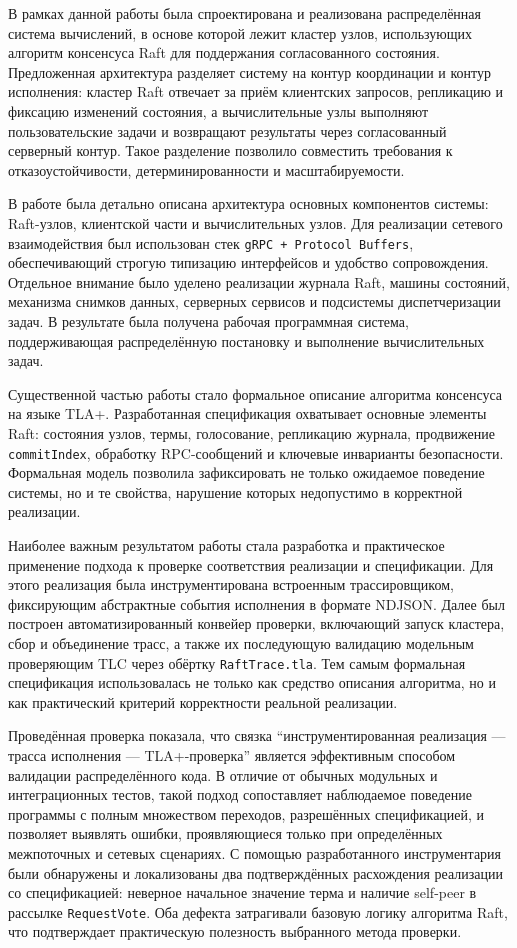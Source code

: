 \conclusion

В рамках данной работы была спроектирована и реализована распределённая система
вычислений, в основе которой лежит кластер узлов,
использующих алгоритм консенсуса Raft для поддержания согласованного состояния.
Предложенная архитектура разделяет систему на контур координации
и контур исполнения: кластер Raft отвечает за приём клиентских запросов,
репликацию и фиксацию изменений состояния, а вычислительные узлы выполняют
пользовательские задачи и возвращают результаты через согласованный
серверный контур. Такое разделение позволило совместить требования
к отказоустойчивости, детерминированности и масштабируемости.

В работе была детально описана архитектура основных компонентов системы:
Raft-узлов, клиентской части и вычислительных узлов. Для реализации сетевого
взаимодействия был использован стек \texttt{gRPC + Protocol Buffers},
обеспечивающий строгую типизацию интерфейсов и удобство сопровождения.
Отдельное внимание было уделено реализации журнала Raft, машины состояний,
механизма снимков данных, серверных сервисов и подсистемы диспетчеризации задач.
В результате была получена рабочая программная система, поддерживающая
распределённую постановку и выполнение вычислительных задач.

Существенной частью работы стало формальное описание алгоритма консенсуса
на языке TLA+. Разработанная спецификация охватывает основные элементы Raft:
состояния узлов, термы, голосование, репликацию журнала, продвижение
\texttt{commitIndex}, обработку RPC-сообщений и ключевые инварианты
безопасности. Формальная модель позволила зафиксировать не только ожидаемое
поведение системы, но и те свойства, нарушение которых недопустимо
в корректной реализации.

Наиболее важным результатом работы стала разработка и практическое применение
подхода к проверке соответствия реализации и спецификации.
Для этого реализация была инструментирована встроенным трассировщиком,
фиксирующим абстрактные события исполнения в формате NDJSON.
Далее был построен автоматизированный конвейер проверки, включающий запуск
кластера, сбор и объединение трасс, а также их последующую валидацию
модельным проверяющим TLC через обёртку \texttt{RaftTrace.tla}.
Тем самым формальная спецификация использовалась не только как средство
описания алгоритма, но и как практический критерий корректности
реальной реализации.

Проведённая проверка показала, что связка
``инструментированная реализация --- трасса исполнения --- TLA+-проверка''
является эффективным способом валидации распределённого кода.
В отличие от обычных модульных и интеграционных тестов, такой подход
сопоставляет наблюдаемое поведение программы с полным множеством переходов,
разрешённых спецификацией, и позволяет выявлять ошибки,
проявляющиеся только при определённых межпоточных и сетевых сценариях.
С помощью разработанного инструментария были обнаружены и локализованы
два подтверждённых расхождения реализации со спецификацией:
неверное начальное значение терма и наличие self-peer в рассылке
\texttt{RequestVote}. Оба дефекта затрагивали базовую логику алгоритма Raft,
что подтверждает практическую полезность выбранного метода проверки.

